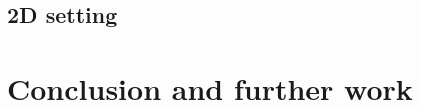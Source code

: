 \documentclass[a4paper,14pt]{extarticle}
\begin{document}
\subsection{2D setting} %
\label{sub:2d_setting}



\section{Conclusion and further work} %
\label{sec:conclusion_and_further_work}

\end{document}
